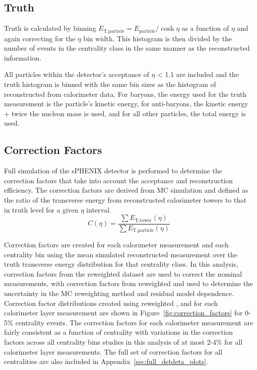 \subsection{Truth \detdeta}
Truth \detdeta is calculated by binning $E_{\text{T,particle}}=E_{\text{particle}}/\cosh\eta$ as a function of $\eta$ and again correcting for the $\eta$ bin width. 
This histogram is then divided by the number of events in the centrality class in the same manner as the reconstructed \detdeta information. 

All particles within the detector's acceptance of $\eta$ < 1.1 are included and the truth \detdeta histogram is binned with the same bin sizes as the histogram of reconstructed \detdeta from calorimeter data. 
For baryons, the energy used for the truth \detdeta measurement is the particle's kinetic energy, for anti-baryons, the kinetic energy + twice the nucleon mass is used, and for all other particles, the total energy is used.

\subsection{Correction Factors}
Full simulation of the sPHENIX detector is performed to determine the \detdeta correction factors that take into account the acceptance and reconstruction efficiency.
The correction factors are derived from MC simulation and defined as the ratio of the transverse energy from reconstructed calorimeter towers to that in truth level for a given $\eta$ interval.
\begin{equation}
    C(\eta) = \frac{ \sum E_{\text{T,tower}}(\eta)}{ \sum E_{\text{T,particle}}(\eta)}
\end{equation}

Correction factors are created for each calorimeter measurement and each centrality bin using the mean simulated reconstructed \detdeta measurement over the truth transverse energy distribution for that centrality class. 
In this analysis, correction factors from the reweighted \epos dataset are used to correct the nominal \detdeta measurements, with correction factors from reweighted \ampt and \hijing used to determine the uncertainty in the MC reweighting method and residual model dependence. 
Correction factor distributions created using reweighted \epos, \ampt and \hijing for each calorimeter layer \detdeta measurement are shown in Figure~\ref{fig:correction_factors} for 0-5\% centrality events.
The correction factors for each calorimeter measurement are fairly consistent as a function of centrality with variations in the correction factors across all centrality bins studies in this analysis of at most 2-4\% for all calorimeter layer measurements.
The full set of correction factors for all centralities are also included in Appendix~\ref{sec:full_detdeta_plots}.

